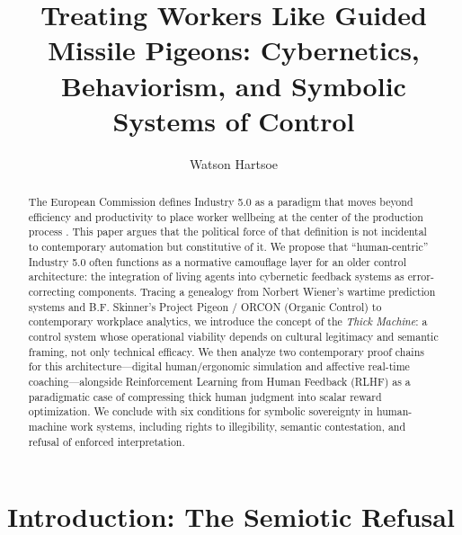 \documentclass[runningheads]{llncs}
\begin{document}
\title{Treating Workers Like Guided Missile Pigeons: Cybernetics, Behaviorism, and Symbolic Systems of Control}

\author{Watson Hartsoe}

\maketitle

\begin{abstract}
The European Commission defines Industry 5.0 as a paradigm that moves beyond efficiency and productivity to place worker wellbeing at the center of the production process \cite{breque2021industry}. This paper argues that the political force of that definition is not incidental to contemporary automation but constitutive of it. We propose that ``human-centric'' Industry 5.0 often functions as a normative camouflage layer for an older control architecture: the integration of living agents into cybernetic feedback systems as error-correcting components. Tracing a genealogy from Norbert Wiener's wartime prediction systems and B.F. Skinner's Project Pigeon / ORCON (Organic Control) to contemporary workplace analytics, we introduce the concept of the \emph{Thick Machine}: a control system whose operational viability depends on cultural legitimacy and semantic framing, not only technical efficacy. We then analyze two contemporary proof chains for this architecture---digital human/ergonomic simulation and affective real-time coaching---alongside Reinforcement Learning from Human Feedback (RLHF) as a paradigmatic case of compressing thick human judgment into scalar reward optimization. We conclude with six conditions for symbolic sovereignty in human-machine work systems, including rights to illegibility, semantic contestation, and refusal of enforced interpretation.

\end{abstract}

\section{Introduction: The Semiotic Refusal}
\end{document}
